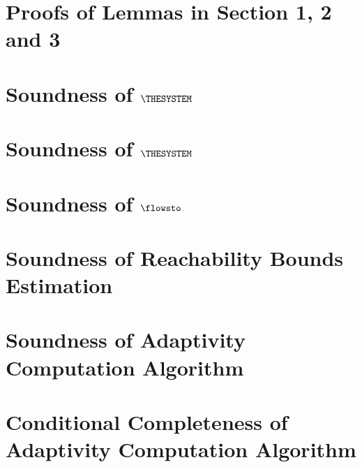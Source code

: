 
\section{Proofs of Lemmas in Section 1, 2 and 3}
\label{apdx:lemma_sec123}

\clearpage
\section{Soundness of $\THESYSTEM$ }
\label{apdx:adapt_soundness}

\clearpage
\section{Soundness of $\THESYSTEM$  }
\label{apdx:adapt_soundness_extend}

\clearpage
\section{Soundness of $\flowsto$ }
\label{apdx:flowsto_soundness_extend}

\clearpage
\section{Soundness of Reachability Bounds Estimation}
\label{apdx:reachability_soundness}

\clearpage
\section{}
\label{apdx:edgeweight_soundness}

\clearpage
% 
\section{Soundness of Adaptivity Computation Algorithm}
\label{apdx:adaptalg_soundness}

\section{Conditional Completeness of Adaptivity Computation Algorithm}
\label{apdx:adaptalg_completeness}



